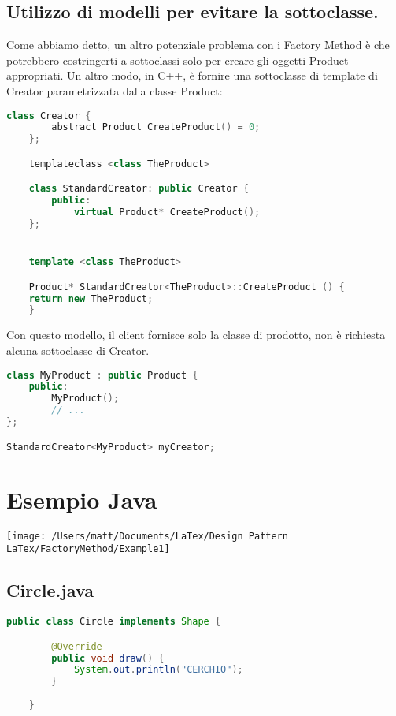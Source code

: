 \subsection{Utilizzo di modelli per evitare la sottoclasse.} 
Come abbiamo detto, un altro potenziale problema con i Factory Method è che potrebbero costringerti a sottoclassi solo per creare gli oggetti Product appropriati. Un altro modo, in C++, è fornire una sottoclasse di template di Creator parametrizzata dalla classe Product:

\begin{lstlisting}[language=c++]
    class Creator {
        abstract Product CreateProduct() = 0;
    };

    templateclass <class TheProduct>

    class StandardCreator: public Creator {
        public:
            virtual Product* CreateProduct();
    };


    template <class TheProduct>

    Product* StandardCreator<TheProduct>::CreateProduct () {
    return new TheProduct;
    }
\end{lstlisting}

Con questo modello, il client fornisce solo la classe di prodotto, non è richiesta alcuna sottoclasse di Creator.

\begin{lstlisting}[language=c++]
class MyProduct : public Product {
    public:
        MyProduct();
        // ... 
};

StandardCreator<MyProduct> myCreator;
\end{lstlisting}


\section{Esempio Java}
\texttt{[image: /Users/matt/Documents/LaTex/Design Pattern LaTex/FactoryMethod/Example1]}

\subsection{Circle.java}
\begin{lstlisting}[language=java]
    public class Circle implements Shape {

        @Override
        public void draw() {
            System.out.println("CERCHIO");
        }
        
    }
\end{lstlisting}

